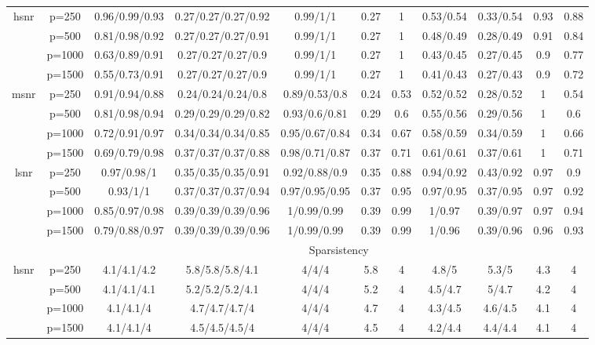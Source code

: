 \begin{table}[ht]
{\begin{tabular}{|c|c|ccccccccc|}
\midrule\multirow{4}[2]{*}{hsnr} & p=250 & 0.96/0.99/0.93 & 0.27/0.27/0.27/0.92 & 0.99/1/1 & 0.27 & 1 & 0.53/0.54 & 0.33/0.54 & 0.93 & 0.88 \\ 
   & p=500 & 0.81/0.98/0.92 & 0.27/0.27/0.27/0.91 & 0.99/1/1 & 0.27 & 1 & 0.48/0.49 & 0.28/0.49 & 0.91 & 0.84 \\ 
   & p=1000 & 0.63/0.89/0.91 & 0.27/0.27/0.27/0.9 & 0.99/1/1 & 0.27 & 1 & 0.43/0.45 & 0.27/0.45 & 0.9 & 0.77 \\ 
   & p=1500 & 0.55/0.73/0.91 & 0.27/0.27/0.27/0.9 & 0.99/1/1 & 0.27 & 1 & 0.41/0.43 & 0.27/0.43 & 0.9 & 0.72 \\ 
  \midrule\multirow{4}[2]{*}{msnr} & p=250 & 0.91/0.94/0.88 & 0.24/0.24/0.24/0.8 & 0.89/0.53/0.8 & 0.24 & 0.53 & 0.52/0.52 & 0.28/0.52 & 1 & 0.54 \\ 
   & p=500 & 0.81/0.98/0.94 & 0.29/0.29/0.29/0.82 & 0.93/0.6/0.81 & 0.29 & 0.6 & 0.55/0.56 & 0.29/0.56 & 1 & 0.6 \\ 
   & p=1000 & 0.72/0.91/0.97 & 0.34/0.34/0.34/0.85 & 0.95/0.67/0.84 & 0.34 & 0.67 & 0.58/0.59 & 0.34/0.59 & 1 & 0.66 \\ 
   & p=1500 & 0.69/0.79/0.98 & 0.37/0.37/0.37/0.88 & 0.98/0.71/0.87 & 0.37 & 0.71 & 0.61/0.61 & 0.37/0.61 & 1 & 0.71 \\ 
  \midrule\multirow{4}[2]{*}{lsnr} & p=250 & 0.97/0.98/1 & 0.35/0.35/0.35/0.91 & 0.92/0.88/0.9 & 0.35 & 0.88 & 0.94/0.92 & 0.43/0.92 & 0.97 & 0.9 \\ 
   & p=500 & 0.93/1/1 & 0.37/0.37/0.37/0.94 & 0.97/0.95/0.95 & 0.37 & 0.95 & 0.97/0.95 & 0.37/0.95 & 0.97 & 0.92 \\ 
   & p=1000 & 0.85/0.97/0.98 & 0.39/0.39/0.39/0.96 & 1/0.99/0.99 & 0.39 & 0.99 & 1/0.97 & 0.39/0.97 & 0.97 & 0.94 \\ 
   & p=1500 & 0.79/0.88/0.97 & 0.39/0.39/0.39/0.96 & 1/0.99/0.99 & 0.39 & 0.99 & 1/0.96 & 0.39/0.96 & 0.96 & 0.93 \\ 
   \midrule 
 \multicolumn{1}{|c}{} &       & \multicolumn{9}{c|}{Sparsistency} \\
\midrule\multirow{4}[2]{*}{hsnr} & p=250 & 4.1/4.1/4.2 & 5.8/5.8/5.8/4.1 & 4/4/4 & 5.8 & 4 & 4.8/5 & 5.3/5 & 4.3 & 4 \\ 
   & p=500 & 4.1/4.1/4.1 & 5.2/5.2/5.2/4.1 & 4/4/4 & 5.2 & 4 & 4.5/4.7 & 5/4.7 & 4.2 & 4 \\ 
   & p=1000 & 4.1/4.1/4 & 4.7/4.7/4.7/4 & 4/4/4 & 4.7 & 4 & 4.3/4.5 & 4.6/4.5 & 4.1 & 4 \\ 
   & p=1500 & 4.1/4.1/4 & 4.5/4.5/4.5/4 & 4/4/4 & 4.5 & 4 & 4.2/4.4 & 4.4/4.4 & 4.1 & 4 \\ 

\end{tabular}}
\end{table}
